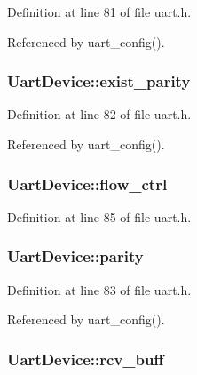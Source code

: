 Definition at line 81 of file uart.\-h.



Referenced by uart\-\_\-config().

\hypertarget{structUartDevice_ab0dbde04e07cf399428582ce9d8bc43d}{
\subsubsection[{exist\-\_\-parity}]{ Uart\-Device\-::exist\-\_\-parity}}\label{structUartDevice_ab0dbde04e07cf399428582ce9d8bc43d}


Definition at line 82 of file uart.\-h.



Referenced by uart\-\_\-config().

\hypertarget{structUartDevice_a7d7e4e0d15a906b2f3c6d4d2febc45a2}{
\subsubsection[{flow\-\_\-ctrl}]{ Uart\-Device\-::flow\-\_\-ctrl}}\label{structUartDevice_a7d7e4e0d15a906b2f3c6d4d2febc45a2}


Definition at line 85 of file uart.\-h.

\hypertarget{structUartDevice_aaa1f4b3ac8e9a72e0701105ad7d8078e}{
\subsubsection[{parity}]{ Uart\-Device\-::parity}}\label{structUartDevice_aaa1f4b3ac8e9a72e0701105ad7d8078e}


Definition at line 83 of file uart.\-h.



Referenced by uart\-\_\-config().

\hypertarget{structUartDevice_a9daa6a5b871ff1c87427231dff168f41}{
\subsubsection[{rcv\-\_\-buff}]{ Uart\-Device\-::rcv\-\_\-buff}}\label{structUartDevice_a9daa6a5b871ff1c87427231dff168f41}


